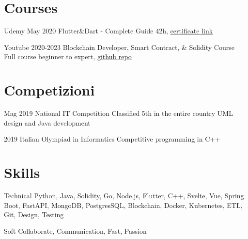 \documentclass{tccv}
\begin{document}
\section{Courses}

\begin{yearlist}

\item[Udemy]{May 2020}
     {Flutter\&Dart - Complete Guide}
     {42h, \href{https://www.udemy.com/certificate/UC-c6f5a32f-babc-42f9-8a0a-6effadf9e7cd/}{certificate link}}

\item[Youtube]{2020-2023}
    {Blockchain Developer, Smart Contract, \& Solidity Course}
    {Full course beginner to expert, \href{https://github.com/Cyfrin/foundry-full-course-f23}{github repo}}

\end{yearlist}


\section{Competizioni}

\begin{yearlist}

\item[]{Mag 2019}
     {National IT Competition}
     {Classified 5th in the entire country \newline
     UML design and Java development}

\item[]{2019}
    {Italian Olympiad in Informatics}
    {Competitive programming in C++}

\end{yearlist}


\section{Skills}

\begin{factlist}

\item{Technical}
     {Python, Java, Solidity, Go, Node.js, Flutter, C++, Svelte, Vue, Spring Boot, FastAPI, MongoDB, PostgresSQL, Blockchain, Docker, Kubernetes, ETL, Git, Design, Testing}

\item{Soft}
     {Collaborate, Communication, Fast, Passion}

\end{factlist}
\end{document}
